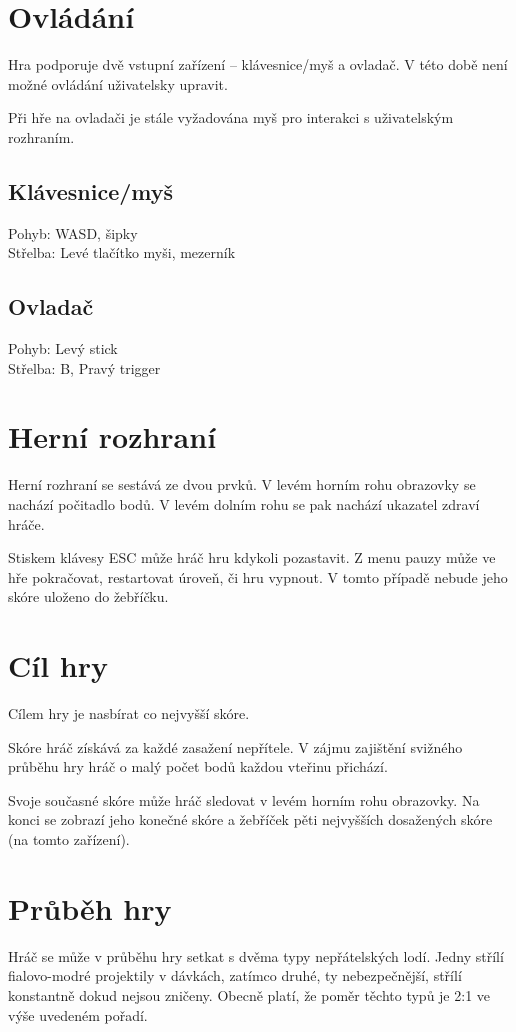 \documentclass[12pt,a4paper,hidelinks]{article}
\begin{document}
\section{Ovládání}
Hra podporuje dvě vstupní zařízení – klávesnice/myš a ovladač. V této době není možné ovládání uživatelsky upravit.

Při hře na ovladači je stále vyžadována myš pro interakci s uživatelským rozhraním.
\subsection{Klávesnice/myš}
Pohyb: WASD, šipky\\
Střelba: Levé tlačítko myši, mezerník

\subsection{Ovladač}
Pohyb: Levý stick\\
Střelba: B, Pravý trigger

\section{Herní rozhraní}
Herní rozhraní se sestává ze dvou prvků. V levém horním rohu obrazovky se nachází počitadlo bodů. V levém dolním rohu se pak nachází ukazatel zdraví hráče.

Stiskem klávesy ESC může hráč hru kdykoli pozastavit. Z menu pauzy může ve hře pokračovat, restartovat úroveň, či hru vypnout. V tomto případě nebude jeho skóre uloženo do žebříčku.

\section{Cíl hry}
Cílem hry je nasbírat co nejvyšší skóre.

Skóre hráč získává za každé zasažení nepřítele. V zájmu zajištění svižného průběhu hry hráč o malý počet bodů každou vteřinu přichází.

Svoje současné skóre může hráč sledovat v levém horním rohu obrazovky. Na konci se zobrazí jeho konečné skóre a žebříček pěti nejvyšších dosažených skóre (na tomto zařízení).
\section{Průběh hry}
Hráč se může v průběhu hry setkat s dvěma typy nepřátelských lodí. Jedny střílí fialovo-modré projektily v dávkách, zatímco druhé, ty nebezpečnější, střílí konstantně dokud nejsou zničeny. Obecně platí, že poměr těchto typů je 2:1 ve výše uvedeném pořadí.
\end{document}
